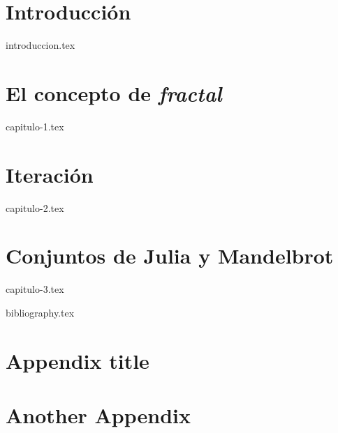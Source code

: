 \documentclass[11pt]{report}
\begin{document}
\chapter*{Introducción}
\setcounter{page}{1}


{introduccion.tex}


\chapter{El concepto de \textit{fractal}}
\label{chap:concepto}

{capitulo-1.tex}

\chapter{Iteración}
\label{chap:iteracion}

{capitulo-2.tex}


\chapter{Conjuntos de Julia y Mandelbrot}
\label{chap:Julia-Mandelbrot}

{capitulo-3.tex}


{bibliography.tex}



\appendix
\cleardoublepage


\chapter{Appendix title}

\chapter{Another Appendix}
\end{document}
